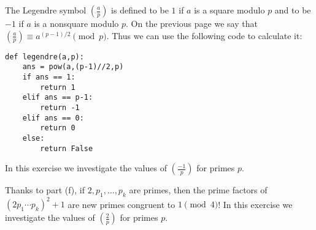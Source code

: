 \documentclass[12pt]{exam}
\begin{document}
\begin{questions}
  \newpage
  \question The Legendre symbol $(\frac ap)$ is defined to be $1$ if $a$ is a square modulo $p$ and to be $-1$ if $a$ is a nonsquare modulo $p$. On the previous page we say that $(\frac ap)\equiv a^{(p-1)/2}\pmod{p}$. Thus we can use the following code to calculate it:
  \begin{lstlisting}
def legendre(a,p):
    ans = pow(a,(p-1)//2,p)
    if ans == 1:
        return 1
    elif ans == p-1:
        return -1
    elif ans == 0:
        return 0
    else:
        return False
  \end{lstlisting}
  In this exercise we investigate the values of $(\frac{-1}{p})$ for primes $p$.
  Thanks to part (f), if $2,p_1,\ldots,p_k$ are primes, then the prime factors of $(2p_1\cdots p_k)^2+1$ are new primes congruent to $1\pmod{4}$!
  \newpage
  \question In this exercise we investigate the values of $(\frac2p)$ for primes $p$.
  \begin{parts}

\end{parts}
\end{questions}
\end{document}
